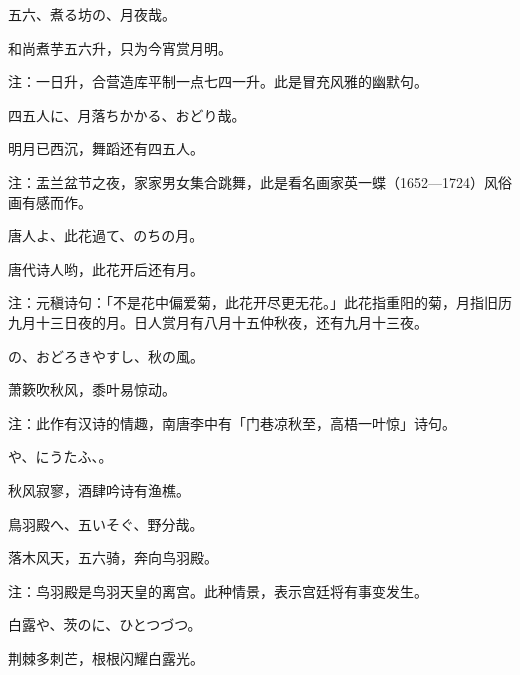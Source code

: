 \begin{haiku}
    {\FH 五六、煮る坊の、月夜哉。}

    {\FK 和尚煮芋五六升，只为今宵赏月明。}

    {\FT 注：一日升，合营造库平制一点七四一升。此是冒充风雅的幽默句。}
\end{haiku}

\begin{haiku}
    {\FH 四五人に、月落ちかかる、おどり哉。}

    {\FK 明月已西沉，舞蹈还有四五人。}

    {\FT 注：盂兰盆节之夜，家家男女集合跳舞，此是看名画家英一蝶（1652—1724）风俗画有感而作。}
\end{haiku}

\begin{haiku}
    {\FH 唐人よ、此花過て、のちの月。}

    {\FK 唐代诗人哟，此花开后还有月。}

    {\FT 注：元稹诗句：「不是花中偏爱菊，此花开尽更无花。」此花指重阳的菊，月指旧历九月十三日夜的月。日人赏月有八月十五仲秋夜，还有九月十三夜。}
\end{haiku}

\begin{haiku}
    {\FH {}の、おどろきやすし、秋の風。}

    {\FK 萧簌吹秋风，黍叶易惊动。}

    {\FT 注：此作有汉诗的情趣，南唐李中有「门巷凉秋至，高梧一叶惊」诗句。}
\end{haiku}

\begin{haiku}
    {\FH {}や、にうたふ、。}

    {\FK 秋风寂寥，酒肆吟诗有渔樵。}
\end{haiku}

\begin{haiku}
    {\FH 鳥羽殿へ、五いそぐ、野分哉。}

    {\FK 落木风天，五六骑，奔向鸟羽殿。}

    {\FT 注：鸟羽殿是鸟羽天皇的离宫。此种情景，表示宫廷将有事变发生。}
\end{haiku}

\begin{haiku}
    {\FH 白露や、茨のに、ひとつづつ。}

    {\FK 荆棘多刺芒，根根闪耀白露光。}
\end{haiku}

